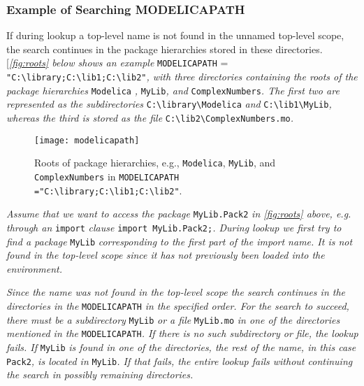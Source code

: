 \subsubsection{Example of Searching MODELICAPATH}

If during lookup a top-level name is not found in the unnamed top-level
scope, the search continues in the package hierarchies stored in these
directories. {[}\emph{\autoref{fig:roots} below shows an example} \lstinline[basicstyle=\ttfamily]!MODELICAPATH! =
\lstinline[basicstyle=\ttfamily]!"C:\library;C:\lib1;C:\lib2"!\emph{,
with three directories containing the roots of the package hierarchies}
\lstinline[basicstyle=\ttfamily]!Modelica! \emph{,} \lstinline[basicstyle=\ttfamily]!MyLib!\emph{, and} \lstinline[basicstyle=\ttfamily]!ComplexNumbers!\emph{. The first two are represented as the subdirectories} \lstinline[basicstyle=\ttfamily]!C:\library\Modelica! \emph{and}
\lstinline[basicstyle=\ttfamily]!C:\lib1\MyLib!\emph{, whereas the third is stored
as the file} \lstinline[basicstyle=\ttfamily]!C:\lib2\ComplexNumbers.mo!\emph{.}

\begin{figure}[H]
\caption{Roots of package hierarchies, e.g.,
\texttt{Modelica}, \texttt{MyLib}, and \texttt{ComplexNumbers} in
\texttt{MODELICAPATH ="C:\textbackslash library;C:\textbackslash lib1;C:\textbackslash lib2"}.}
\label{fig:roots}
\texttt{[image: modelicapath]}
\end{figure}

\emph{Assume that we want to access the package} \lstinline[basicstyle=\ttfamily]!MyLib.Pack2! \emph{in
\autoref{fig:roots} above, e.g. through an} \lstinline[basicstyle=\ttfamily]!import! \emph{clause} 
\lstinline[basicstyle=\ttfamily]!import MyLib.Pack2;!\emph{. During lookup we first try to find a package} \lstinline[basicstyle=\ttfamily]!MyLib!
\emph{corresponding to the first part of the import name. It is not
found in the top-level scope since it has not previously been loaded
into the environment. }

\emph{Since the name was not found in the top-level scope the search
continues in the directories in the} \lstinline[basicstyle=\ttfamily]!MODELICAPATH! \emph{in the specified
order. For the search to succeed, there must be a subdirectory} \lstinline[basicstyle=\ttfamily]!MyLib!
\emph{or a file} \lstinline[basicstyle=\ttfamily]!MyLib.mo! \emph{in one of the directories mentioned in
the} \lstinline[basicstyle=\ttfamily]!MODELICAPATH!\emph{. If there is no such subdirectory or file, the
lookup fails. If} \lstinline[basicstyle=\ttfamily]!MyLib! \emph{is found in one of the directories, the
rest of the name, in this case} \lstinline[basicstyle=\ttfamily]!Pack2!\emph{, is located in} \lstinline[basicstyle=\ttfamily]!MyLib!\emph{.
If that fails, the entire lookup fails without continuing the search in
possibly remaining directories.}

